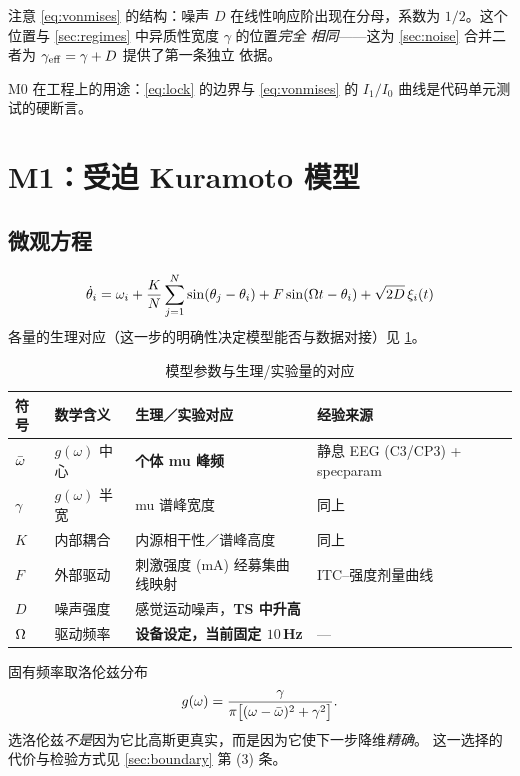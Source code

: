 \begin{remark}\label{rem:Dposition}
注意 \cref{eq:vonmises} 的结构：噪声 $D$ 在线性响应阶出现在分母，系数为
$1/2$。这个位置与 \cref{sec:regimes} 中异质性宽度 $\gamma$ 的位置\emph{完全
相同}——这为 \cref{sec:noise} 合并二者为 $\gamma_{\mathrm{eff}}=\gamma+D$ 提供了第一条独立
依据。
\end{remark}

M0 在工程上的用途：\cref{eq:lock} 的边界与 \cref{eq:vonmises} 的
$I_1/I_0$ 曲线是代码单元测试的硬断言。

\section{M1：受迫 Kuramoto 模型}
\label{sec:M1}

\subsection{微观方程}

\begin{equation}\label{eq:micro}
\dot\theta_i=\omega_i
+\frac{K}{N}\sum_{j=1}^{N}\sin(\theta_j-\theta_i)
+F\sin(\Omega t-\theta_i)
+\sqrt{2D}\,\xi_i(t)
\end{equation}
%
各量的生理对应（这一步的明确性决定模型能否与数据对接）见 \cref{tab:params}。

\begin{table}[htbp]
\centering
\caption{模型参数与生理/实验量的对应}
\label{tab:params}
\small
\begin{tabularx}{\textwidth}{@{}l l X l@{}}
\toprule
符号 & 数学含义 & 生理／实验对应 & 经验来源 \\
\midrule
$\bar{\omega}$ & $g(\omega)$ 中心 & \textbf{个体 mu 峰频} & 静息 EEG (C3/CP3) + specparam \\
$\gamma$ & $g(\omega)$ 半宽 & mu 谱峰宽度 & 同上 \\
$K$ & 内部耦合 & 内源相干性／谱峰高度 & 同上 \\
$F$ & 外部驱动 & 刺激强度 (mA) 经募集曲线映射 & ITC–强度剂量曲线 \\
$D$ & 噪声强度 & 感觉运动噪声，\textbf{TS 中升高} & \citet{Gialopsou2025} \\
$\Omega$ & 驱动频率 & \textbf{设备设定，当前固定 $10\,$Hz} & --- \\
\bottomrule
\end{tabularx}
\end{table}

固有频率取洛伦兹分布
%
\begin{equation}\label{eq:lorentz}
g(\omega)=\frac{\gamma}{\pi\bigl[(\omega-\bar{\omega})^2+\gamma^2\bigr]} .
\end{equation}
%
选洛伦兹\emph{不是}因为它比高斯更真实，而是因为它使下一步降维\emph{精确}。
这一选择的代价与检验方式见 \cref{sec:boundary} 第 (3) 条。

